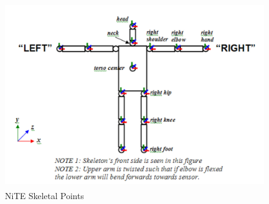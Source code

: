 \begin{figure}
	[h] \centering 
	\includegraphics[height=8cm]{figures/content/ni-joints.jpg} \caption{NiTE Skeletal Points} \label{fg:ni:joints} 
\end{figure}
